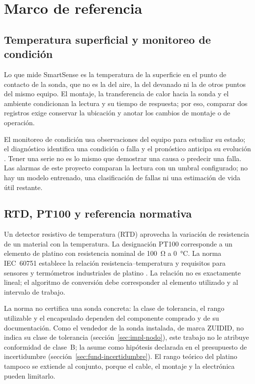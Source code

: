 \chapter{Marco de referencia}
\label{cap:marco-referencia}

\section{Temperatura superficial y monitoreo de condición}
Lo que mide SmartSense es la temperatura de la superficie en el punto de contacto de la sonda, que no es la del aire, la del devanado ni la de otros puntos del mismo equipo. El montaje, la transferencia de calor hacia la sonda y el ambiente condicionan la lectura y su tiempo de respuesta; por eso, comparar dos registros exige conservar la ubicación y anotar los cambios de montaje o de operación.

El monitoreo de condición usa observaciones del equipo para estudiar su estado; el diagnóstico identifica una condición o falla y el pronóstico anticipa su evolución \citep{jardine2006}. Tener una serie no es lo mismo que demostrar una causa o predecir una falla. Las alarmas de este proyecto comparan la lectura con un umbral configurado; no hay un modelo entrenado, una clasificación de fallas ni una estimación de vida útil restante.

\section{RTD, PT100 y referencia normativa}
\label{sec:marco-rtd}
Un detector resistivo de temperatura (RTD) aprovecha la variación de resistencia de un material con la temperatura. La designación PT100 corresponde a un elemento de platino con resistencia nominal de \SI{100}{\ohm} a \SI{0}{\celsius}. La norma IEC~60751 establece la relación resistencia--temperatura y requisitos para sensores y termómetros industriales de platino \citep{iec60751}. La relación no es exactamente lineal; el algoritmo de conversión debe corresponder al elemento utilizado y al intervalo de trabajo.

La norma no certifica una sonda concreta: la clase de tolerancia, el rango utilizable y el encapsulado dependen del componente comprado y de su documentación. Como el vendedor de la sonda instalada, de marca ZUIDID, no indica su clase de tolerancia (sección~\ref{sec:impl-nodo}), este trabajo no le atribuye conformidad de clase~B; la asume como hipótesis declarada en el presupuesto de incertidumbre (sección~\ref{sec:fund-incertidumbre}). El rango teórico del platino tampoco se extiende al conjunto, porque el cable, el montaje y la electrónica pueden limitarlo.

